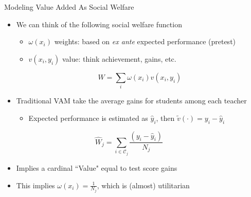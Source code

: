 \documentclass[t,aspectratio=169,11pt]{beamer}
\begin{document}
\begin{frame}{Modeling Value Added As Social Welfare}

\begin{itemize}
    \item We can think of the following social welfare function
    \begin{itemize}
        \item $\omega(x_i)$ weights: based on \textit{ex ante} expected performance (pretest)
        \item $v(x_i,y_i)$ value: think achievement, gains, etc.
    \end{itemize}
    \[
    W  = \sum_i \omega(x_i) v(x_i,y_i) 
    \] 
    
    \item Traditional VAM take the average gains for students among each teacher
    \begin{itemize}
        \item Expected performance is estimated as $\hat{y}_i$, then $\tilde{v}(\cdot) = y_i - \hat{y}_i$
    \end{itemize}
    \[
    \hat{W}_{j}  = \sum_{i\in\mathcal{C}_j} \frac{(y_i-\hat{y}_i)}{N_{j}} \hspace{3em}
    \]
    
    \item Implies a cardinal ``Value" equal to test score gains
    
    \item This implies $\omega(x_i)=\frac{1}{N_j}$, which is (almost) utilitarian
    
    
\end{itemize}


\end{frame}
\end{document}
